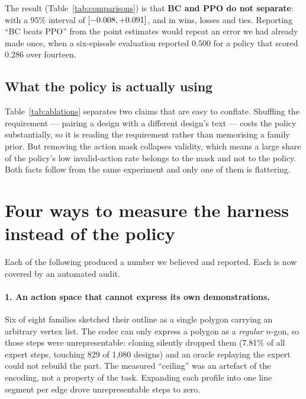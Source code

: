 \documentclass{article}
\begin{document}
\begin{table}[t]
\centering

\caption{Paired bootstrap on the per-task difference in progress score, 5{,}000
resamples. An interval straddling zero means this benchmark cannot separate the
two policies at this sample size.}
\label{tab:comparisons}
\end{table}

The result (Table~\ref{tab:comparisons}) is that \textbf{BC and PPO do not
separate}: \BCvsPPODelta{} with a 95\% interval of $[-0.008, +0.091]$, and
\BCvsPPOWLT{} in wins, losses and ties. Reporting ``BC beats PPO'' from the
point estimates would repeat an error we had already made once, when a
six-episode evaluation reported $0.500$ for a policy that scored $0.286$ over
fourteen.

\subsection{What the policy is actually using}

\begin{table}[t]
\centering

\caption{Ablations. Each row corrupts one input and re-runs the identical suite.}
\label{tab:ablations}
\end{table}

Table~\ref{tab:ablations} separates two claims that are easy to conflate.
Shuffling the requirement --- pairing a design with a different design's text ---
costs the policy substantially, so it is reading the requirement rather than
memorising a family prior. But removing the action mask collapses validity,
which means a large share of the policy's low invalid-action rate belongs to the
mask and not to the policy. Both facts follow from the same experiment and only
one of them is flattering.

\section{Four ways to measure the harness instead of the policy}\label{sec:pitfalls}

Each of the following produced a number we believed and reported. Each is now
covered by an automated audit.

\paragraph{1. An action space that cannot express its own demonstrations.}
Six of eight families sketched their outline as a single polygon carrying an
arbitrary vertex list. The codec can only express a polygon as a \emph{regular}
$n$-gon, so those steps were unrepresentable: cloning silently dropped them
(7.81\% of all expert steps, touching 829 of 1{,}080 designs) and an oracle
replaying the expert could not rebuild the part. The measured ``ceiling'' was an
artefact of the encoding, not a property of the task. Expanding each profile
into one line segment per edge drove unrepresentable steps to zero.
\end{document}
